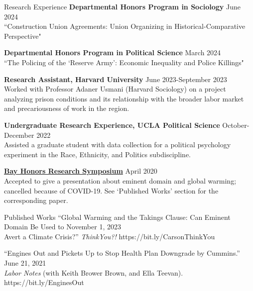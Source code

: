\documentclass[
	11pt, %
]{resume} %
\begin{document}
\begin{samepage}
\begin{rSection}{Research Experience}
\textbf{Departmental Honors Program in Sociology} \hfill June 2024\\
“Construction Union Agreements: Union Organizing in Historical-Comparative Perspective"

\textbf{Departmental Honors Program in Political Science} \hfill March 2024\\
“The Policing of the `Reserve Army': Economic Inequality and Police Killings"

\textbf{Research Assistant, Harvard University} \hfill June 2023-September 2023\\
Worked with Professor Adaner Usmani (Harvard Sociology) on a project analyzing prison conditions and its relationship with the broader labor market and precariousness of work in the region.

\textbf{Undergraduate Research Experience, UCLA Political Science} \hfill October-December 2022\\
Assisted a graduate student with data collection for a political psychology experiment in the Race, Ethnicity, and Politics subdiscipline.

\href{https://bayhonors.org/}{\textbf{Bay Honors Research Symposium}} \hfill April 2020\\
Accepted to give a presentation about eminent domain and global warming; cancelled because
of COVID-19. See ‘Published Works’ section for the corresponding paper.

\end{rSection}
\end{samepage}
\begin{samepage}
\begin{rSection}{Published Works}
“Global Warming and the Takings Clause: Can Eminent Domain Be Used to \hfill November 1, 2023 \\
Avert a Climate Crisis?” \textit{ThinkYou?!} https://bit.ly/CarsonThinkYou

“Engines Out and Pickets Up to Stop Health Plan Downgrade by Cummins.” \hfill June 21, 2021 \\
\textit{Labor Notes} (with Keith Brower Brown, and Ella Teevan). https://bit.ly/EnginesOut

\end{rSection}
\end{samepage}
\end{document}
